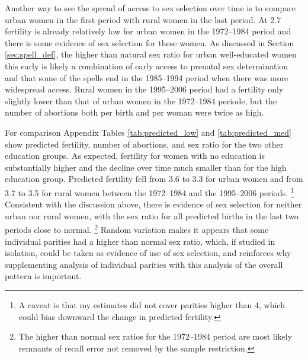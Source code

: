 \documentclass[12pt,letterpaper]{article}
\begin{document}
Another way to see the spread of access to sex selection over time is to compare
urban women in the first period with rural women in the last period.
At 2.7 fertility is already relatively low for urban women in the 1972--1984 period and 
there is some evidence of sex selection for these women.
As discussed in Section \ref{sec:spell_def}, the higher than natural sex ratio for
urban well-educated women this early is likely a combination of early access to prenatal
sex determination and that some of the spells end in the 1985--1994 period when there 
was more widespread access.
Rural women in the 1995--2006 period had a fertility only slightly lower than that
of urban women in the 1972--1984 periode, but the number of abortions both per birth and 
per woman were twice as high.


For comparison Appendix Tables \ref{tab:predicted_low} and \ref{tab:predicted_med}
show predicted fertility, number of abortions, and sex ratio for the two other
education groups.
As expected, fertility for women with no education is substantially higher
and the decline over time much smaller than for the high education group.
Predicted fertility fell from 3.6 to 3.3 for urban women and from 3.7 to 3.5 for rural 
women between the 1972--1984 and the 1995--2006 periods.%
\footnote{
A caveat is that my estimates did not cover parities higher than 4, which could
bias downward the change in predicted fertility.
}
Consistent with the discussion above, there is evidence of sex selection for neither
urban nor rural women, with the sex ratio for all predicted births in the last two periods 
close to normal.%
\footnote{
The higher than normal sex ratios for the 1972--1984 period are most likely
remnants of recall error not removed by the sample restriction. 
}
Random variation makes it appears that some individual parities had a higher
than normal sex ratio, which, if studied in isolation, could be taken as evidence
of use of sex selection, and reinforces why supplementing analysis of individual 
parities with this analysis of the overall pattern is important.
\end{document}
